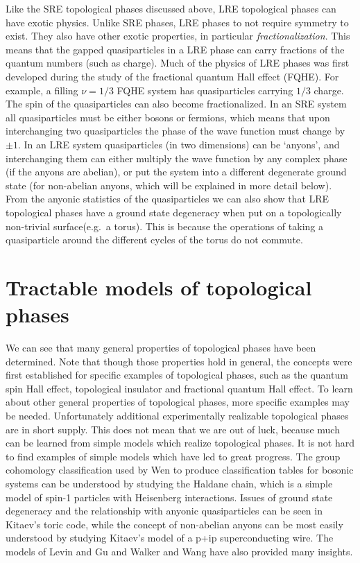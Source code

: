 Like the SRE topological phases discussed above, LRE topological phases can have exotic physics. Unlike SRE phases, LRE phases to not require symmetry to exist. They also have other exotic properties, in particular \emph{fractionalization}. This means that the gapped quasiparticles in a LRE phase can carry fractions of the quantum numbers (such as charge). Much of the physics of LRE phases was first developed during the study of the fractional quantum Hall effect (FQHE). For example, a filling $\nu=1/3$ FQHE system has quasiparticles carrying $1/3$ charge. The spin of the quasiparticles can also become fractionalized. In an SRE system all quasiparticles must be either bosons or fermions, which means that upon interchanging two quasiparticles the phase of the wave function must change by $\pm 1$. In an LRE system quasiparticles (in two dimensions) can be `anyons', and interchanging them can either multiply the wave function by any complex phase (if the anyons are abelian), or put the system into a different degenerate ground state (for non-abelian anyons, which will be explained in more detail below). 
From the anyonic statistics of the quasiparticles we can also show that LRE topological phases have a ground state degeneracy when put on a topologically non-trivial surface(e.g.~a torus). This is because the operations of taking a quasiparticle around the different cycles of the torus do not commute.

\section{Tractable models of topological phases}

	We can see that many general properties of topological phases have been determined. Note that though those properties hold in general, the concepts were first established for specific examples of topological phases, such as the quantum spin Hall effect, topological insulator and fractional quantum Hall effect. To learn about other general properties of topological phases, more specific examples may be needed. Unfortunately additional experimentally realizable topological phases are in short supply. This does not mean that we are out of luck, because much can be learned from simple models which realize topological phases. It is not hard to find examples of simple models which have led to great progress. The group cohomology classification used by Wen to produce classification tables for bosonic systems\cite{WenScience,*WenPRB} can be understood by studying the Haldane chain, which is a simple model of spin-1 particles with Heisenberg interactions. Issues of ground state degeneracy and the relationship with anyonic quasiparticles can be seen in Kitaev's toric code\cite{KitaevHouches}, while the concept of non-abelian anyons can be most easily understood by studying Kitaev's model of a p+ip superconducting wire. The models of Levin and Gu\cite{LevinGu} and Walker and Wang\cite{WalkerWang,BurnellSimon} have also provided many insights.

